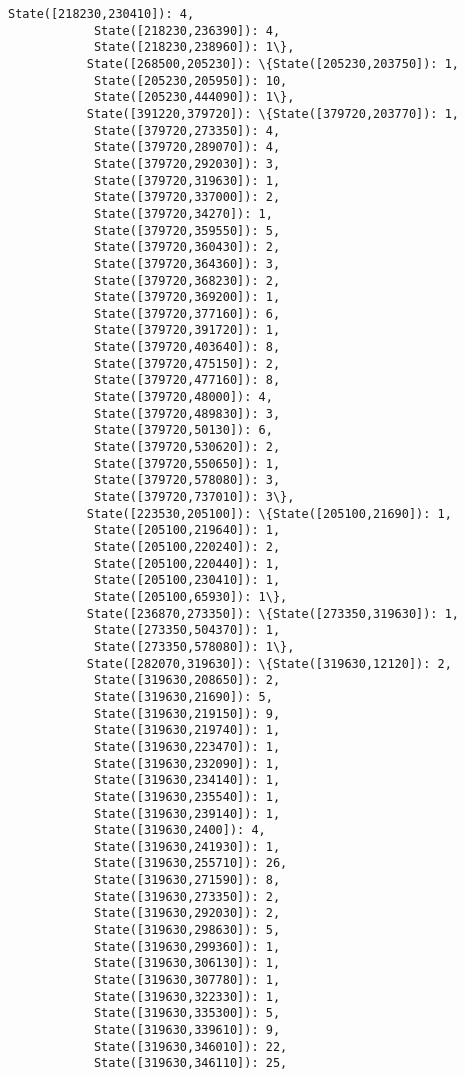\documentclass[11pt]{article}
\begin{document}
\begin{Verbatim}[commandchars=\\\{\}]
            State([218230,230410]): 4,
            State([218230,236390]): 4,
            State([218230,238960]): 1\},
           State([268500,205230]): \{State([205230,203750]): 1,
            State([205230,205950]): 10,
            State([205230,444090]): 1\},
           State([391220,379720]): \{State([379720,203770]): 1,
            State([379720,273350]): 4,
            State([379720,289070]): 4,
            State([379720,292030]): 3,
            State([379720,319630]): 1,
            State([379720,337000]): 2,
            State([379720,34270]): 1,
            State([379720,359550]): 5,
            State([379720,360430]): 2,
            State([379720,364360]): 3,
            State([379720,368230]): 2,
            State([379720,369200]): 1,
            State([379720,377160]): 6,
            State([379720,391720]): 1,
            State([379720,403640]): 8,
            State([379720,475150]): 2,
            State([379720,477160]): 8,
            State([379720,48000]): 4,
            State([379720,489830]): 3,
            State([379720,50130]): 6,
            State([379720,530620]): 2,
            State([379720,550650]): 1,
            State([379720,578080]): 3,
            State([379720,737010]): 3\},
           State([223530,205100]): \{State([205100,21690]): 1,
            State([205100,219640]): 1,
            State([205100,220240]): 2,
            State([205100,220440]): 1,
            State([205100,230410]): 1,
            State([205100,65930]): 1\},
           State([236870,273350]): \{State([273350,319630]): 1,
            State([273350,504370]): 1,
            State([273350,578080]): 1\},
           State([282070,319630]): \{State([319630,12120]): 2,
            State([319630,208650]): 2,
            State([319630,21690]): 5,
            State([319630,219150]): 9,
            State([319630,219740]): 1,
            State([319630,223470]): 1,
            State([319630,232090]): 1,
            State([319630,234140]): 1,
            State([319630,235540]): 1,
            State([319630,239140]): 1,
            State([319630,2400]): 4,
            State([319630,241930]): 1,
            State([319630,255710]): 26,
            State([319630,271590]): 8,
            State([319630,273350]): 2,
            State([319630,292030]): 2,
            State([319630,298630]): 5,
            State([319630,299360]): 1,
            State([319630,306130]): 1,
            State([319630,307780]): 1,
            State([319630,322330]): 1,
            State([319630,335300]): 5,
            State([319630,339610]): 9,
            State([319630,346010]): 22,
            State([319630,346110]): 25,

\end{Verbatim}
\end{document}
